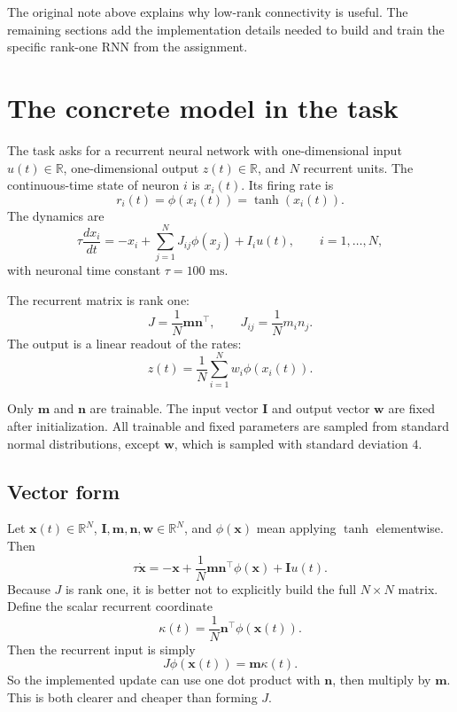 \documentclass[11pt]{article}
\newcommand{\R}{\mathbb{R}}
\newcommand{\vx}{\mathbf{x}}
\newcommand{\vm}{\mathbf{m}}
\newcommand{\vn}{\mathbf{n}}
\newcommand{\vI}{\mathbf{I}}
\newcommand{\vw}{\mathbf{w}}
\begin{document}
The original note above explains why low-rank connectivity is useful. The
remaining sections add the implementation details needed to build and train the
specific rank-one RNN from the assignment.

\section{The concrete model in the task}

The task asks for a recurrent neural network with one-dimensional input
$u(t) \in \R$, one-dimensional output $z(t) \in \R$, and $N$ recurrent units.
The continuous-time state of neuron $i$ is $x_i(t)$. Its firing rate is
\begin{equation}
  r_i(t) = \phi(x_i(t)) = \tanh(x_i(t)).
\end{equation}
The dynamics are
\begin{equation}
  \tau \frac{d x_i}{dt}
  =
  -x_i
  +
  \sum_{j=1}^{N} J_{ij}\phi(x_j)
  +
  I_i u(t),
  \qquad i=1,\ldots,N,
  \label{eq:task_continuous}
\end{equation}
with neuronal time constant $\tau = 100\text{ ms}$.

The recurrent matrix is rank one:
\begin{equation}
  J = \frac{1}{N}\vm\vn^\top,
  \qquad
  J_{ij} = \frac{1}{N}m_i n_j.
  \label{eq:rank_one_J}
\end{equation}
The output is a linear readout of the rates:
\begin{equation}
  z(t)
  =
  \frac{1}{N}\sum_{i=1}^{N}w_i\phi(x_i(t)).
  \label{eq:task_output}
\end{equation}

Only $\vm$ and $\vn$ are trainable. The input vector $\vI$ and output vector
$\vw$ are fixed after initialization. All trainable and fixed parameters are
sampled from standard normal distributions, except $\vw$, which is sampled with
standard deviation $4$.

\subsection{Vector form}

Let $\vx(t) \in \R^N$, $\vI,\vm,\vn,\vw \in \R^N$, and
$\phi(\vx)$ mean applying $\tanh$ elementwise. Then
\begin{equation}
  \tau \dot{\vx}
  =
  -\vx
  +
  \frac{1}{N}\vm\vn^\top\phi(\vx)
  +
  \vI u(t).
  \label{eq:vector_continuous}
\end{equation}
Because $J$ is rank one, it is better not to explicitly build the full
$N \times N$ matrix. Define the scalar recurrent coordinate
\begin{equation}
  \kappa(t)
  =
  \frac{1}{N}\vn^\top \phi(\vx(t)).
  \label{eq:kappa}
\end{equation}
Then the recurrent input is simply
\begin{equation}
  J\phi(\vx(t)) = \vm \kappa(t).
\end{equation}
So the implemented update can use one dot product with $\vn$, then multiply by
$\vm$. This is both clearer and cheaper than forming $J$.
\end{document}
